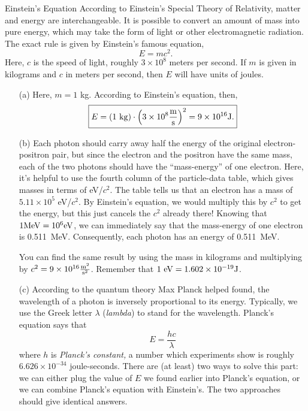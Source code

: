 \documentclass[12pt]{article}
\begin{document}
\begin{probdesc}{8}{Einstein's Equation}
According to Einstein's Special Theory of Relativity, matter and
energy are interchangeable.  It is possible to convert an amount of
mass into pure energy, which may take the form of light or other
electromagnetic radiation.  The exact rule is given by Einstein's
famous equation,
\begin{equation}
E = mc^2.
\end{equation}
Here, $c$ is the speed of light, roughly $3\times10^8$ meters per
second.  If $m$ is given in kilograms and $c$ in meters per second,
then $E$ will have units of joules.
\begin{enumerate}
\item[(a)] Here, $m = 1$ kg.  According to Einstein's equation, then,
\begin{equation}
\boxed{E = (1 {\rm\ kg}) \cdot \left(3\times10^8 \frac{\rm m}{\rm
    s}\right)^2 = 9\times10^{16} \rm J.}
\end{equation}


\item[(b)] Each photon should carry away half the energy of the
  original electron-positron pair, but since the electron and the
  positron have the same mass, each of the two photons should have the
  ``mass-energy'' of one electron.  Here, it's helpful to use the
  fourth column of the particle-data table, which gives masses in
  terms of eV/$c^2$.  The table tells us that an electron has a mass
  of $5.11\times10^5$ eV/$c^2$.  By Einstein's equation, we would
  multiply this by $c^2$ to get the energy, but this just cancels the
  $c^2$ already there!  Knowing that $1 {\rm MeV} = 10^6 {\rm
  eV}$, we can immediately say that the mass-energy of one electron is
  0.511~MeV.  Consequently, each photon has an energy of 0.511~MeV.

  You can find the same result by using the mass in kilograms and
  multiplying by $c^2 = 9\times10^{16} \frac{{\rm m}^2}{{\rm s}^2}$.
  Remember that $1 {\rm\ eV} = 1.602\times10^{-19} {\rm J}$.

\item[(c)] According to the quantum theory Max Planck helped found,
  the wavelength of a photon is inversely proportional to its energy.
  Typically, we use the Greek letter $\lambda$ ({\em lambda}) to stand
  for the wavelength.  Planck's equation says that
  \begin{equation}
    E = \frac{hc}{\lambda}
  \end{equation}
  where $h$ is {\em Planck's constant,} a number which experiments
  show is roughly $6.626\times10^{-34}$ joule-seconds.  There are (at
  least) two ways to solve this part: we can either plug the value of
  $E$ we found earlier into Planck's equation, or we can combine
  Planck's equation with Einstein's.  The two approaches should give
  identical answers.


\end{enumerate}
\end{probdesc}
\end{document}
